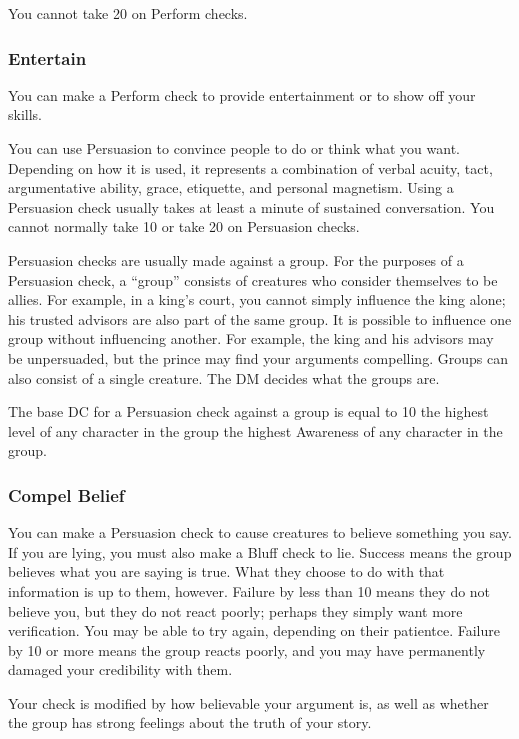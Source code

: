 You cannot take 20 on Perform checks.

\subsubsection{Entertain}
You can make a Perform check to provide entertainment or to show off your skills.

You can use Persuasion to convince people to do or think what you want. Depending on how it is used, it represents a combination of verbal acuity, tact, argumentative ability, grace, etiquette, and personal magnetism. Using a Persuasion check usually takes at least a minute of sustained conversation. You cannot normally take 10 or take 20 on Persuasion checks.

Persuasion checks are usually made against a group. For the purposes of a Persuasion check, a ``group'' consists of creatures who consider themselves to be allies. For example, in a king's court, you cannot simply influence the king alone; his trusted advisors are also part of the same group. It is possible to influence one group without influencing another. For example, the king and his advisors may be unpersuaded, but the prince may find your arguments compelling. Groups can also consist of a single creature. The DM decides what the groups are.

The base DC for a Persuasion check against a group is equal to 10 \add the highest level of any character in the group \add the highest Awareness of any character in the group.

\subsubsection{Compel Belief}
You can make a Persuasion check to cause creatures to believe something you say. If you are lying, you must also make a Bluff check to lie. Success means the group believes what you are saying is true. What they choose to do with that information is up to them, however. Failure by less than 10 means they do not believe you, but they do not react poorly; perhaps they simply want more verification. You may be able to try again, depending on their patientce. Failure by 10 or more means the group reacts poorly, and you may have permanently damaged your credibility with them.

Your check is modified by how believable your argument is, as well as whether the group has strong feelings about the truth of your story.

